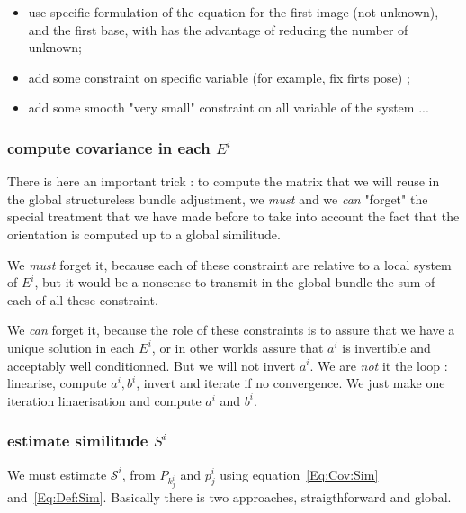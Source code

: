 \begin{itemize}
    \item use specific formulation of the equation for the first image (not unknown), and the first base,
          with has the advantage of reducing the number of unknown;
          
    \item add some constraint on specific variable (for example, fix firts pose) ;

    \item add some smooth "very small" constraint on all variable of the system ...
\end{itemize}


\subsubsection{compute  covariance  in each $E^i$}

\label{StrucLess:Comp:Cov}
There is here an important trick : to compute the matrix that we will
reuse in the global structureless bundle adjustment, we \emph{must} and we \emph{can} 
"forget" the special treatment that we have made  before to  take into account the fact
that the orientation is computed up to a global similitude.

We \emph{must} forget it, because each of these constraint are relative to  a local 
system of $E^i$, but it would be a nonsense to transmit in the global bundle the sum
of each of all these constraint.

We \emph{can} forget it, because the role of these constraints is to assure that we have a
unique solution in each $E^i$, or in other worlds assure that $a^i$ is invertible and
acceptably well conditionned. But we will not invert $a^i$. We are \emph{not} it the loop :
linearise, compute $a^i, b^i$, invert and iterate if no convergence. We just make one iteration
linaerisation and compute $a^i$ and $b^i$.


\subsubsection{estimate  similitude $S^i$}

We must estimate $\mathcal{S}^i$, from $P_{k^i_j}$  and $p^i_j$ using equation~\ref{Eq:Cov:Sim} and~\ref{Eq:Def:Sim}.
Basically there is two approaches, straigthforward and global.

